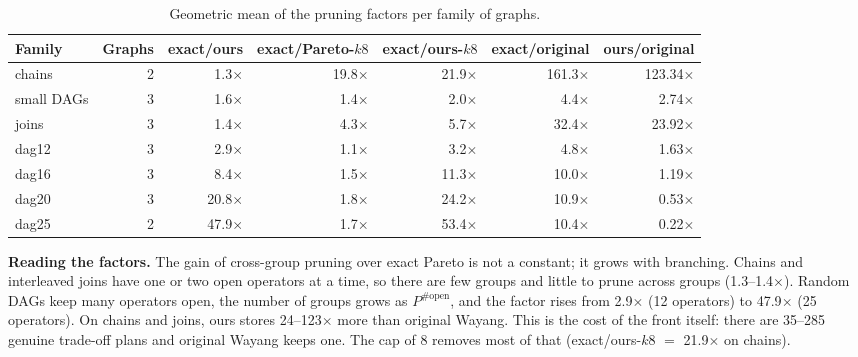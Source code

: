 \documentclass[10pt,a4paper]{article}
\begin{document}
\begin{table}[h]\centering\small
\caption{Geometric mean of the pruning factors per family of graphs.}\label{tab:families}
\begin{tabular}{@{}lr|rrr|rr@{}}
\toprule
Family & Graphs & exact/ours & exact/Pareto-$k8$ & exact/ours-$k8$ & exact/original & ours/original\\
\midrule
chains & 2 & 1.3$\times$ & 19.8$\times$ & 21.9$\times$ & 161.3$\times$ & 123.34$\times$\\
small DAGs & 3 & 1.6$\times$ & 1.4$\times$ & 2.0$\times$ & 4.4$\times$ & 2.74$\times$\\
joins & 3 & 1.4$\times$ & 4.3$\times$ & 5.7$\times$ & 32.4$\times$ & 23.92$\times$\\
dag12 & 3 & 2.9$\times$ & 1.1$\times$ & 3.2$\times$ & 4.8$\times$ & 1.63$\times$\\
dag16 & 3 & 8.4$\times$ & 1.5$\times$ & 11.3$\times$ & 10.0$\times$ & 1.19$\times$\\
dag20 & 3 & 20.8$\times$ & 1.8$\times$ & 24.2$\times$ & 10.9$\times$ & 0.53$\times$\\
dag25 & 2 & 47.9$\times$ & 1.7$\times$ & 53.4$\times$ & 10.4$\times$ & 0.22$\times$\\
\bottomrule
\end{tabular}
\end{table}

\noindent
\textbf{Reading the factors.} The gain of cross-group pruning over exact Pareto is not a constant; it grows with
branching. Chains and interleaved joins have one or two open operators at a time, so there are few groups and little
to prune across groups (1.3--1.4$\times$). Random DAGs keep many operators open, the number of groups grows as
$P^{\#\text{open}}$, and the factor rises from 2.9$\times$ (12 operators) to 47.9$\times$ (25 operators). On chains and
joins, ours stores 24--123$\times$ more than original Wayang. This is the cost of the front itself: there are 35--285
genuine trade-off plans and original Wayang keeps one. The cap of 8 removes most of that (exact/ours-$k8$ $=$
21.9$\times$ on chains).
\end{document}
